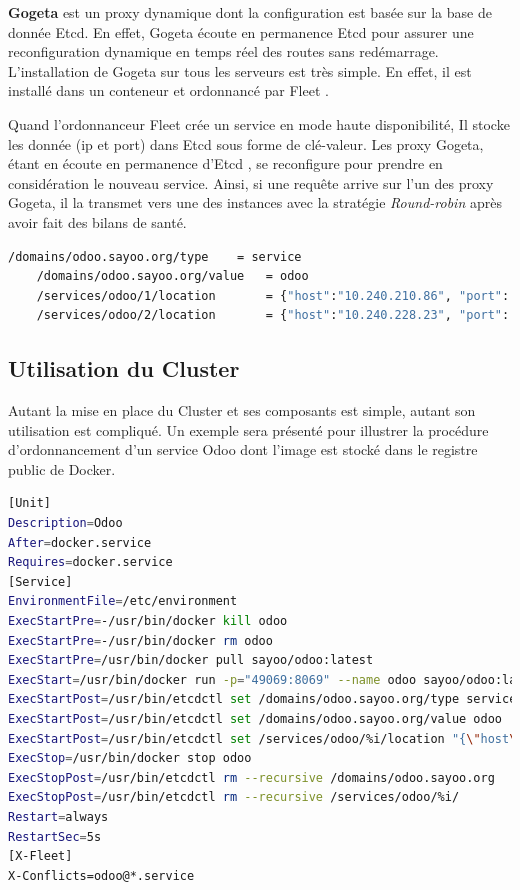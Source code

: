 \begin{onehalfspace}
\textbf{Gogeta} est un proxy dynamique dont la configuration est basée sur la base de donnée Etcd. En effet, Gogeta écoute en permanence Etcd pour assurer une reconfiguration dynamique en temps réel des routes sans redémarrage. L'installation de Gogeta sur tous les serveurs est très simple. En effet, il est installé dans un conteneur et ordonnancé par Fleet \cite{gogeta}.

Quand l'ordonnanceur Fleet crée un service en mode haute disponibilité, Il stocke les donnée (\acrshort{ip} et port) dans Etcd sous forme de clé-valeur. Les proxy Gogeta, étant en écoute en permanence d'Etcd , se reconfigure pour prendre en considération le nouveau service. Ainsi, si une requête arrive sur l'un des proxy Gogeta, il la transmet vers une des instances avec la stratégie \emph{Round-robin} après avoir fait des bilans de santé.

\begin{lstlisting}[language=bash,caption=Contenu de la base de donnée Etcd]
	/domains/odoo.sayoo.org/type 	= service
	/domains/odoo.sayoo.org/value 	= odoo
	/services/odoo/1/location		= {"host":"10.240.210.86", "port": 42654}
	/services/odoo/2/location		= {"host":"10.240.228.23", "port": 42669}
\end{lstlisting}

\subsection{Utilisation du Cluster}

Autant la mise en place du Cluster et ses composants est simple, autant son utilisation est compliqué. Un exemple sera présenté pour illustrer la procédure d'ordonnancement d'un service Odoo dont l'image est stocké dans le registre public de Docker.

	\begin{lstlisting}[language=bash,caption=Fichier d'ordonnancement d'un service Odoo]
[Unit]
Description=Odoo
After=docker.service
Requires=docker.service
[Service]
EnvironmentFile=/etc/environment
ExecStartPre=-/usr/bin/docker kill odoo
ExecStartPre=-/usr/bin/docker rm odoo
ExecStartPre=/usr/bin/docker pull sayoo/odoo:latest
ExecStart=/usr/bin/docker run -p="49069:8069" --name odoo sayoo/odoo:latest
ExecStartPost=/usr/bin/etcdctl set /domains/odoo.sayoo.org/type service
ExecStartPost=/usr/bin/etcdctl set /domains/odoo.sayoo.org/value odoo
ExecStartPost=/usr/bin/etcdctl set /services/odoo/%i/location "{\"host\":\"${COREOS_PRIVATE_IPV4}\", \"port\": 49069}"
ExecStop=/usr/bin/docker stop odoo
ExecStopPost=/usr/bin/etcdctl rm --recursive /domains/odoo.sayoo.org
ExecStopPost=/usr/bin/etcdctl rm --recursive /services/odoo/%i/
Restart=always
RestartSec=5s
[X-Fleet]
X-Conflicts=odoo@*.service
	\end{lstlisting}



\end{onehalfspace}
